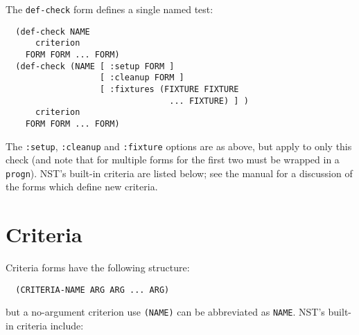 \documentclass{article}
\begin{document}
The \texttt{def-check} form defines a single named test:
\begin{verbatim}
  (def-check NAME
      criterion
    FORM FORM ... FORM)
  (def-check (NAME [ :setup FORM ]
                   [ :cleanup FORM ]
                   [ :fixtures (FIXTURE FIXTURE
                                 ... FIXTURE) ] )
      criterion
    FORM FORM ... FORM)
\end{verbatim}
The \texttt{:setup}, \texttt{:cleanup} and \texttt{:fixture} options
are as above, but apply to only this check (and note that for multiple
forms for the first two must be wrapped in a \texttt{progn}).  NST's
built-in criteria are listed below; see the manual for a discussion of
the forms which define new criteria.

\section*{Criteria}
Criteria forms have the following structure:
\begin{verbatim}
  (CRITERIA-NAME ARG ARG ... ARG)
\end{verbatim}
but a no-argument criterion use \texttt{(NAME)} can be abbreviated as
\texttt{NAME}.  NST's built-in criteria include:
\end{document}
